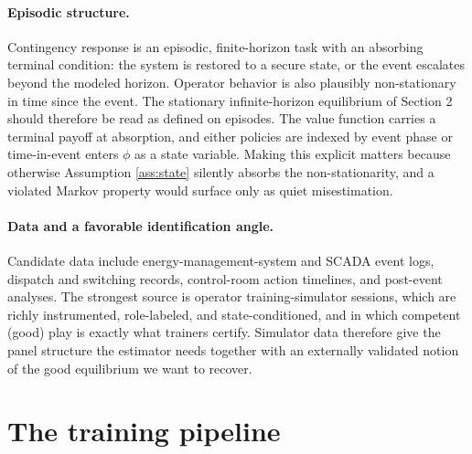 \documentclass[11pt]{article}
\theoremstyle{definition}
\begin{document}
\paragraph{Episodic structure.}
Contingency response is an episodic, finite-horizon task with an absorbing terminal condition: the system is restored to a secure state, or the event escalates beyond the modeled horizon. Operator behavior is also plausibly non-stationary in time since the event. The stationary infinite-horizon equilibrium of Section 2 should therefore be read as defined on episodes. The value function carries a terminal payoff at absorption, and either policies are indexed by event phase or time-in-event enters $\phi$ as a state variable. Making this explicit matters because otherwise Assumption \ref{ass:state} silently absorbs the non-stationarity, and a violated Markov property would surface only as quiet misestimation.

\paragraph{Data and a favorable identification angle.}
Candidate data include energy-management-system and SCADA event logs, dispatch and switching records, control-room action timelines, and post-event analyses. The strongest source is operator training-simulator sessions, which are richly instrumented, role-labeled, and state-conditioned, and in which competent (good) play is exactly what trainers certify. Simulator data therefore give the panel structure the estimator needs together with an externally validated notion of the good equilibrium we want to recover.

\section{The training pipeline}
\end{document}
